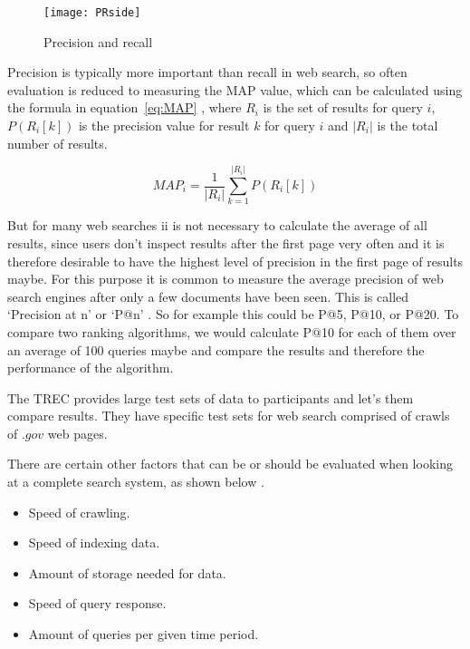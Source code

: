 \begin{figure}[!htbp]
  \centering
  \texttt{[image: PRside]}
  \caption[Precision and recall]{Precision and recall \autocite{Wikimedia2014}}
\label{fig:PR}
\end{figure}

Precision is typically more important than recall in web search, so often evaluation is reduced to measuring the \acf{MAP} value, which can be calculated using the formula in equation~\ref{eq:MAP}\sidepar{$\bm{\Sigma}$~\ref{eq:MAP}} \autocite{Baeza-Yates2011}, where $R_i$ is the set of results for query $i$, $P(R_i[k])$ is the precision value for result $k$ for query $i$ and $|R_i|$ is the total number of results.

\begin{equation}
  MAP_i = \frac{1}{|R_i|} \sum_{k=1}^{|R_i|} P(R_i[k])
\label{eq:MAP}
\end{equation}

But for many web searches ii is not necessary to calculate the average of all results, since users don't inspect results after the first page very often and it is therefore desirable to have the highest level of precision in the first page of results maybe. For this purpose it is common to measure the average precision of web search engines after only a few documents have been seen. This is called `Precision at n' or `P@n' \autocite{Baeza-Yates2011}. So for example this could be P@5, P@10, or P@20. To compare two ranking algorithms, we would calculate P@10 for each of them over an average of 100 queries maybe and compare the results and therefore the performance of the algorithm.

The \acf{TREC} \autocite{Nist2016} provides large test sets of data \autocite{Trec2011} to participants and let's them compare results. They have specific test sets for web search comprised of crawls of $.gov$ web pages.

There are certain other factors that can be or should be evaluated when looking at a complete search system, as shown below \autocite{Baeza-Yates2011}. 

\begin{itemize}
  \item Speed of crawling.
  \item Speed of indexing data.
  \item Amount of storage needed for data.
  \item Speed of query response.
  \item Amount of queries per given time period.
\end{itemize}

